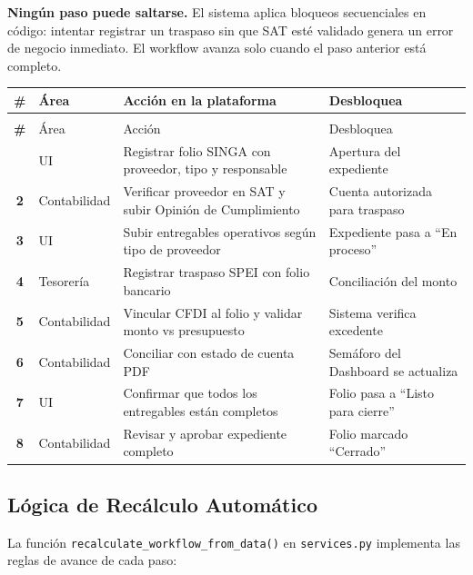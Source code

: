 \documentclass[12pt,a4paper]{article}
\begin{document}
\begin{infobox}
\textbf{Ning\'un paso puede saltarse.} El sistema aplica bloqueos secuenciales en
c\'odigo: intentar registrar un traspaso sin que SAT est\'e validado genera un error
de negocio inmediato. El workflow avanza solo cuando el paso anterior est\'a completo.
\end{infobox}

\bigskip

\begin{longtable}{>{\bfseries}cp{2.5cm}p{6cm}p{3.5cm}}
\toprule
\# & \'Area & Acci\'on en la plataforma & Desbloquea \\
\midrule
\endfirsthead
\multicolumn{4}{c}{\small\textit{(continuaci\'on)}} \\
\toprule
\# & \'Area & Acci\'on & Desbloquea \\
\midrule
\endhead
\bottomrule
\endfoot
1 & UI & Registrar folio SINGA con proveedor, tipo y responsable & Apertura del expediente \\[6pt]
2 & Contabilidad & Verificar proveedor en SAT y subir Opini\'on de Cumplimiento & Cuenta autorizada para traspaso \\[6pt]
3 & UI & Subir entregables operativos seg\'un tipo de proveedor & Expediente pasa a ``En proceso'' \\[6pt]
4 & Tesorer\'ia & Registrar traspaso SPEI con folio bancario & Conciliaci\'on del monto \\[6pt]
5 & Contabilidad & Vincular CFDI al folio y validar monto vs presupuesto & Sistema verifica excedente \\[6pt]
6 & Contabilidad & Conciliar con estado de cuenta PDF & Sem\'aforo del Dashboard se actualiza \\[6pt]
7 & UI & Confirmar que todos los entregables est\'an completos & Folio pasa a ``Listo para cierre'' \\[6pt]
8 & Contabilidad & Revisar y aprobar expediente completo & Folio marcado ``Cerrado'' \\
\end{longtable}

\subsection{L\'ogica de Rec\'alculo Autom\'atico}

La funci\'on \texttt{recalculate\_workflow\_from\_data()} en \texttt{services.py}
implementa las reglas de avance de cada paso:
\end{document}
